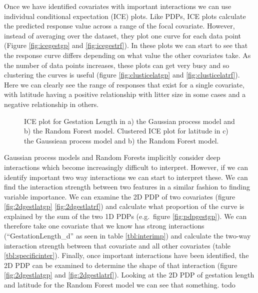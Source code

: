 \documentclass[10pt,]{article}
\begin{document}
Once we have identified covariates with important interactions we can use individual conditional expectation (ICE) plots.
Like PDPs, ICE plots calculate the predicted response value across a range of the focal covariate.
However, instead of averaging over the dataset, they plot one curve for each data point (Figure \ref{fig:icegestgp} and \ref{fig:icegestrf}).
In these plots we can start to see that the response curve differs depending on what value the other covariates take.
As the number of data points increases, these plots can get very busy and so clustering the curves is useful (figure \ref{fig:clusticelatgp} and \ref{fig:clusticelatrf}).
Here we can clearly see the range of responses that exist for a single covariate, with latitude having a positive relationship with litter size in some cases and a negative relationship in others.



\begin{figure}[t!]
  \centering


  \label{fig:ice}
  \caption{
    ICE plot for Gestation Length in a) the Gaussian process model and b) the Random Forest model. 
    Clustered ICE plot for latitude in c) the Gaussiean process model and b) the Random Forest model.
  }
\end{figure}


Gaussian process models and Random Forests implicitly consider deep interactions which become increasingly difficult to interpret.
However, if we can identify important two way interactions we can start to interpret these.
We can find the interaction strength between two features in a similar fashion to finding variable importance.
We can examine the 2D PDP of two covariates (figure \ref{fig:2dgestlatgp} \ref{fig:2dgestlatrf}) and calculate what proportion of the curve is explained by the sum of the two 1D PDPs (e.g.~figure \ref{fig:pdpgestgp}).
We can therefore take one covariate that we know has strong interactions (``GestationLength\_d'' as seen in table \ref{tbl:interimp}) and calculate the two-way interaction strength between that covariate and all other covariates (table \ref{tbl:specificinter}).
Finally, once important interactions have been identified, the 2D PDP can be examined to determine the shape of that interaction (figure \ref{fig:2dgestlatgp} and \ref{fig:2dgestlatrf}).
Looking at the 2D PDP of gestation length and latitude for the Random Forest model we can see that something.
todo
\end{document}
